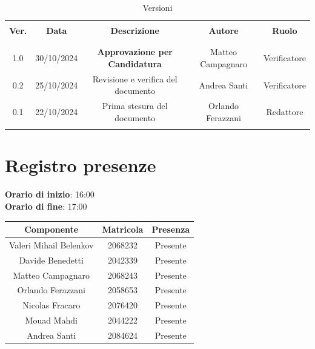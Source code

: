 \documentclass[italian, 12pt]{article}
\begin{document}
\pagestyle{mystyle}


\begin{table}[!h]
	\caption{Versioni}
	\begin{center}
		\begin{tabular}{ c c c c c}
			\hline \\[-2ex]
			\textbf{Ver.} & \textbf{Data} & \textbf{Descrizione} & \textbf{Autore} & \textbf{Ruolo}  \\
			\\[-2ex] \hline \\[-1.5ex]
            1.0 & 30/10/2024 & \textbf{Approvazione per Candidatura} & Matteo Campagnaro & Verificatore\\
            0.2 & 25/10/2024 & Revisione e verifica del documento & Andrea Santi & Verificatore \\
			0.1 & 22/10/2024 & Prima stesura del documento & Orlando Ferazzani & Redattore\\
			\\[-1.5ex] \hline
		\end{tabular}
	\end{center}
\end{table}


\tableofcontents
\newpage


\section{Registro presenze}

\textbf{Orario di inizio}: 16:00\\
\textbf{Orario di fine}: 17:00\\


\begin{flushleft}
	\begin{table}[!h]
	\begin{tabular}{ |c|c|c| } 
		\hline
		\textbf{Componente} & \textbf{Matricola} & \textbf{Presenza} \\
  \hline 
		Valeri Mihail Belenkov & 2068232 & Presente \\ 
		Davide Benedetti 	& 2042339 & Presente \\
		Matteo Campagnaro	& 2068243 & Presente \\
		Orlando Ferazzani 	& 2058653 & Presente \\
		Nicolas Fracaro 	& 2076420 & Presente \\
		Mouad Mahdi		    & 2044222 & Presente \\ 
		Andrea Santi 	    & 2084624 & Presente \\
		\hline
	\end{tabular}
	\end{table}
	\end{flushleft}
\end{document}
